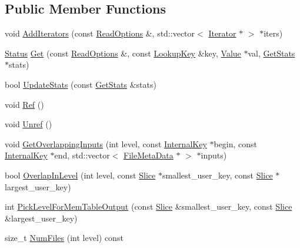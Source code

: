 \subsection*{Public Member Functions}
\begin{DoxyCompactItemize}
\item 
void \hyperlink{classleveldb_1_1_version_a035a0fa5bfe7ab84a711b1138b0b9a3d}{Add\+Iterators} (const \hyperlink{structleveldb_1_1_read_options}{Read\+Options} \&, std\+::vector$<$ \hyperlink{classleveldb_1_1_iterator}{Iterator} $\ast$ $>$ $\ast$iters)
\item 
\hyperlink{classleveldb_1_1_status}{Status} \hyperlink{classleveldb_1_1_version_ac6c1cfef845a4295debdb98ded55a247}{Get} (const \hyperlink{structleveldb_1_1_read_options}{Read\+Options} \&, const \hyperlink{classleveldb_1_1_lookup_key}{Lookup\+Key} \&key, \hyperlink{classleveldb_1_1_value}{Value} $\ast$val, \hyperlink{structleveldb_1_1_version_1_1_get_stats}{Get\+Stats} $\ast$stats)
\item 
bool \hyperlink{classleveldb_1_1_version_a7e5b8451deb7c4b9006fd9d5ccfc2cef}{Update\+Stats} (const \hyperlink{structleveldb_1_1_version_1_1_get_stats}{Get\+Stats} \&stats)
\item 
void \hyperlink{classleveldb_1_1_version_ad237b446c7f7d9e63c4b7c162d6f0064}{Ref} ()
\item 
void \hyperlink{classleveldb_1_1_version_a3f623697f625d4740d5b273c0bf6223a}{Unref} ()
\item 
void \hyperlink{classleveldb_1_1_version_afd86dffba7ce5229778bddd546517392}{Get\+Overlapping\+Inputs} (int level, const \hyperlink{classleveldb_1_1_internal_key}{Internal\+Key} $\ast$begin, const \hyperlink{classleveldb_1_1_internal_key}{Internal\+Key} $\ast$end, std\+::vector$<$ \hyperlink{structleveldb_1_1_file_meta_data}{File\+Meta\+Data} $\ast$ $>$ $\ast$inputs)
\item 
bool \hyperlink{classleveldb_1_1_version_a7945e88b8a4f2f7b6f3201cb3d791f1e}{Overlap\+In\+Level} (int level, const \hyperlink{classleveldb_1_1_slice}{Slice} $\ast$smallest\+\_\+user\+\_\+key, const \hyperlink{classleveldb_1_1_slice}{Slice} $\ast$largest\+\_\+user\+\_\+key)
\item 
int \hyperlink{classleveldb_1_1_version_ac3b623319110ed2a9491723dd4675431}{Pick\+Level\+For\+Mem\+Table\+Output} (const \hyperlink{classleveldb_1_1_slice}{Slice} \&smallest\+\_\+user\+\_\+key, const \hyperlink{classleveldb_1_1_slice}{Slice} \&largest\+\_\+user\+\_\+key)
\item 
size\+\_\+t \hyperlink{classleveldb_1_1_version_a1a6e14233e8f64d432e4aad5a5989ffc}{Num\+Files} (int level) const 

\end{DoxyCompactItemize}
